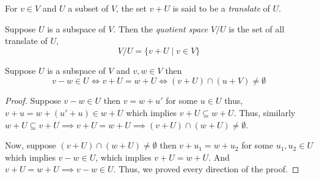 \begin{definition}
    For $v \in V$ and $U$ a subset of $V$, the set $v+U$ is said to be a \textit{translate} of $U$.
\end{definition}

\begin{definition}
    Suppose $U$ is a subspace of $V$. Then the \textit{quotient space} $V/U$ is the set of all translate of $U$,
    \[ V/U = \{ v+ U \mid v \in V \} \]
\end{definition}

\begin{proposition}
    Suppose $U$ is a subspace of $V$ and $v,w \in V$ then
    \[ v-w \in U \iff v+U = w + U \iff (v+U) \cap (u+V) \neq \emptyset \] 
\end{proposition}

\begin{proof}
    Suppose $v-w \in U$ then $v=w+u'$ for some $u \in U$ thus, $v+u = w+(u'+u) \in w + U$ which implies $v+U \subseteq w+U$.
    Thus, similarly $w+U \subseteq v+U \implies v+U = w+U \implies (v+U) \cap (w+U) \neq \emptyset$.

    Now, suppose $(v+U) \cap (w+U) \neq \emptyset$ then $v+u_1 = w+u_2$ for some $u_1,u_2 \in U$ which implies $v-w \in U$, which implies 
    $v+U=w+U$. And $v+U = w+U \implies v-w \in U$. Thus, we proved every direction of the proof.
\end{proof}